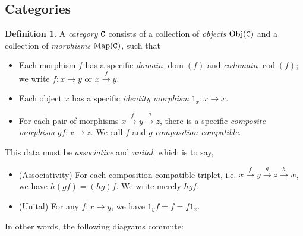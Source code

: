 \documentclass[11 pt]{amsart}
\theoremstyle{plain}   %
\theoremstyle{definition}
\newtheorem{defn}{Definition}[section]
\theoremstyle{remark}
\numberwithin{equation}{section}
\DeclareMathOperator{\dom}{dom}
\DeclareMathOperator{\cod}{cod}
\newcommand{\punctuation}[1]{\makebox[0pt][l]{#1}}
\newcommand{\cat}[1]{{\normalfont\texttt{#1}}}
\newcommand{\Obj}[1]{\text{Obj}(\cat{#1})}
\newcommand{\Map}[1]{\text{Map}(\cat{#1})}
\begin{document}
\subsection{Categories}

\begin{defn}
	A \emph{category} $\cat{C}$ consists of a collection of \emph{objects} $\Obj{C}$
	and a collection of \emph{morphisms} $\Map{C}$, such that

	\begin{itemize}
		\item Each morphism $f$ has a specific \emph{domain} $\dom(f)$ and
		      \emph{codomain} $\cod(f)$; we write $f: x\rightarrow y$ or
		      $x\xrightarrow{f} y$.
		\item Each object $x$ has a specific \emph{identity morphism} $1_x:
			      x\rightarrow x$.
		\item For each pair of morphisms $x\xrightarrow{f} y\xrightarrow{g}
			      z$, there is a specific \emph{composite morphism} $gf:
			      x\rightarrow z$. We call $f$ and $g$ \emph{composition-compatible}.
	\end{itemize}
	This data must be \emph{associative} and \emph{unital}, which is to say,
	\begin{itemize}
		\item (Associativity) For each composition-compatible triplet, i.e.
		      $x\xrightarrow{f}y \xrightarrow{g}z\xrightarrow{h}w$, we have $h(gf) =
			      (hg)f$. We write merely $hgf$.
		\item (Unital) For any $f: x\rightarrow y$, we have $1_yf = f = f1_x$.
	\end{itemize}

	In other words, the following diagrams commute:

	\begin{figure}[H]
		\centering
		\begin{multicols}{2}

		\end{multicols}
	\end{figure}
\end{defn}
\end{document}
